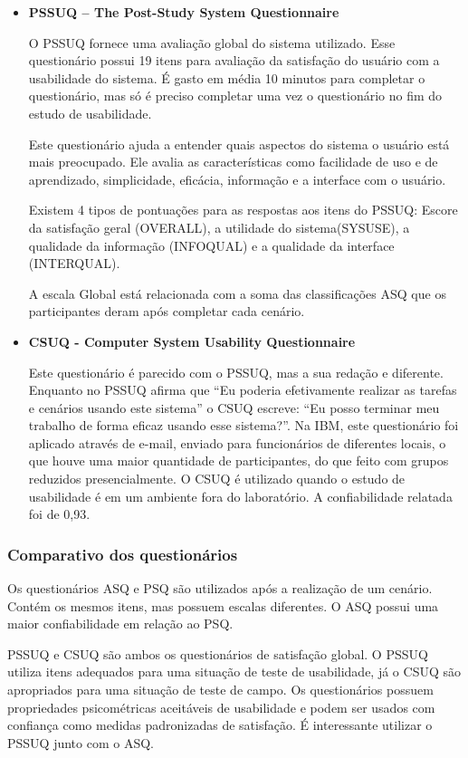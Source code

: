 \begin{itemize}
\item \textbf{PSSUQ – The Post-Study System Questionnaire}

	O PSSUQ fornece uma avaliação global do sistema utilizado. Esse questionário possui 19 itens para avaliação da satisfação do usuário com a usabilidade do sistema. É gasto em média 10 minutos para completar o questionário, mas só é preciso completar uma vez o questionário no fim do estudo de usabilidade. ~\cite{lewis1995ibm} 

	Este questionário ajuda a entender quais aspectos do sistema o usuário está mais preocupado. Ele avalia as características como facilidade de uso e de aprendizado, simplicidade, eficácia, informação e a interface com o usuário.

	Existem 4 tipos de pontuações para as respostas aos itens do PSSUQ: Escore da satisfação geral (OVERALL), a utilidade do sistema(SYSUSE), a qualidade da  informação (INFOQUAL) e a qualidade da interface (INTERQUAL). 

A escala Global está relacionada com a soma das classificações ASQ que os participantes deram após completar cada cenário. 

\item \textbf{CSUQ - Computer System Usability Questionnaire}

	Este questionário é parecido com o PSSUQ, mas a sua redação e diferente. Enquanto no PSSUQ afirma que “Eu poderia efetivamente realizar as tarefas e cenários usando este sistema” o CSUQ escreve: “Eu posso terminar meu trabalho de forma eficaz usando esse sistema?”. Na IBM, este questionário foi aplicado através de e-mail, enviado para funcionários de diferentes locais, o que houve uma maior quantidade de participantes, do que feito com grupos reduzidos presencialmente.
	O CSUQ é utilizado quando o estudo de usabilidade é em um ambiente fora do laboratório. A confiabilidade relatada foi de 0,93.

\end{itemize}

\subsubsection{Comparativo dos questionários}

	Os questionários ASQ e PSQ são utilizados após a realização de um cenário. Contém os mesmos itens, mas possuem escalas diferentes. O ASQ possui uma maior confiabilidade em relação ao PSQ. 

	PSSUQ e CSUQ são ambos os questionários de satisfação global. O PSSUQ utiliza itens adequados para uma situação de teste de usabilidade, já o CSUQ são apropriados para uma situação de teste de campo. Os questionários possuem propriedades psicométricas aceitáveis de usabilidade e podem ser usados com confiança como medidas padronizadas de satisfação. É interessante utilizar o PSSUQ junto com o ASQ.

